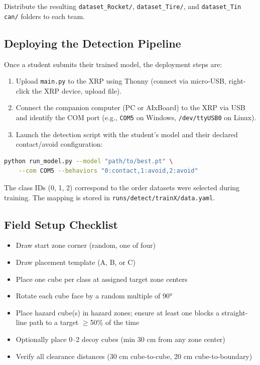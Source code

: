 \documentclass[11pt,a4paper]{article}
\begin{document}
Distribute the resulting \texttt{dataset\_Rocket/}, \texttt{dataset\_Tire/}, and \texttt{dataset\_Tin can/} folders to each team.

\subsection{Deploying the Detection Pipeline}

Once a student submits their trained model, the deployment steps are:

\begin{enumerate}
    \item Upload \texttt{main.py} to the XRP using Thonny (connect via micro-USB, right-click the XRP device, upload file).
    \item Connect the companion computer (PC or AIxBoard) to the XRP via USB and identify the COM port (e.g., \texttt{COM5} on Windows, \texttt{/dev/ttyUSB0} on Linux).
    \item Launch the detection script with the student's model and their declared contact/avoid configuration:
\end{enumerate}

\begin{lstlisting}[language=bash]
python run_model.py --model "path/to/best.pt" \
    --com COM5 --behaviors "0:contact,1:avoid,2:avoid"
\end{lstlisting}

The class IDs (0, 1, 2) correspond to the order datasets were selected during training. The mapping is stored in \texttt{runs/detect/trainX/data.yaml}.

\subsection{Field Setup Checklist}

\begin{itemize}
    \item[$\square$] Draw start zone corner (random, one of four)
    \item[$\square$] Draw placement template (A, B, or C)
    \item[$\square$] Place one cube per class at assigned target zone centers
    \item[$\square$] Rotate each cube face by a random multiple of 90°
    \item[$\square$] Place hazard cube(s) in hazard zones; ensure at least one blocks a straight-line path to a target $\geq$50\% of the time
    \item[$\square$] Optionally place 0--2 decoy cubes (min 30 cm from any zone center)
    \item[$\square$] Verify all clearance distances (30 cm cube-to-cube, 20 cm cube-to-boundary)
\end{itemize}
\end{document}
